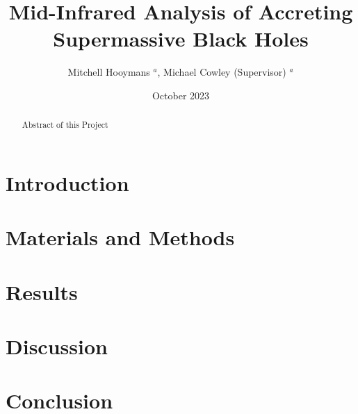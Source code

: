 \documentclass[11pt]{iopart}
\date{October 2023}
\begin{document}
\title{Mid-Infrared Analysis of Accreting Supermassive Black Holes}
\author{Mitchell Hooymans $^a$, Michael Cowley (Supervisor) $^a$}
\address{$^a$ Queensland University of Technology, Brisbane, Australia, 4000}

\begin{abstract}
    Abstract of this Project \cite{assef_mid-infrared_2013}
\end{abstract}
\ioptwocol
\section{Introduction}
\newpage
\section{Materials and Methods}
\newpage
\section{Results}
\section{Discussion}
\section{Conclusion}



\end{document}
